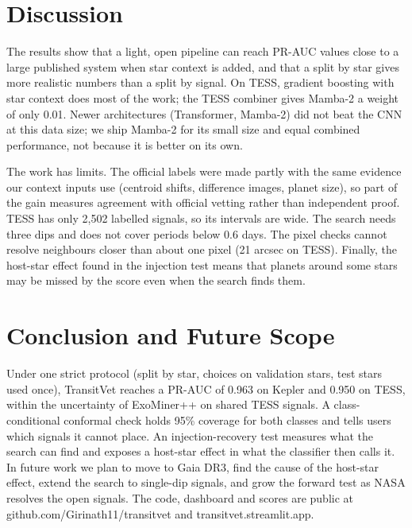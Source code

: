 \documentclass[conference,a4paper]{IEEEtran}
\begin{document}
\section{Discussion}
The results show that a light, open pipeline can reach PR-AUC values close to a large published system when star context is added, and that a split by star gives more realistic numbers than a split by signal. On TESS, gradient boosting with star context does most of the work; the TESS combiner gives Mamba-2 a weight of only 0.01. Newer architectures (Transformer, Mamba-2) did not beat the CNN at this data size; we ship Mamba-2 for its small size and equal combined performance, not because it is better on its own.

The work has limits. The official labels were made partly with the same evidence our context inputs use (centroid shifts, difference images, planet size), so part of the gain measures agreement with official vetting rather than independent proof. TESS has only 2,502 labelled signals, so its intervals are wide. The search needs three dips and does not cover periods below 0.6 days. The pixel checks cannot resolve neighbours closer than about one pixel (21 arcsec on TESS). Finally, the host-star effect found in the injection test means that planets around some stars may be missed by the score even when the search finds them.

\section{Conclusion and Future Scope}
Under one strict protocol (split by star, choices on validation stars, test stars used once), TransitVet reaches a PR-AUC of 0.963 on Kepler and 0.950 on TESS, within the uncertainty of ExoMiner++ on shared TESS signals. A class-conditional conformal check holds 95\% coverage for both classes and tells users which signals it cannot place. An injection-recovery test measures what the search can find and exposes a host-star effect in what the classifier then calls it. In future work we plan to move to Gaia DR3, find the cause of the host-star effect, extend the search to single-dip signals, and grow the forward test as NASA resolves the open signals. The code, dashboard and scores are public at github.com/Girinath11/transitvet and transitvet.streamlit.app.
\end{document}
